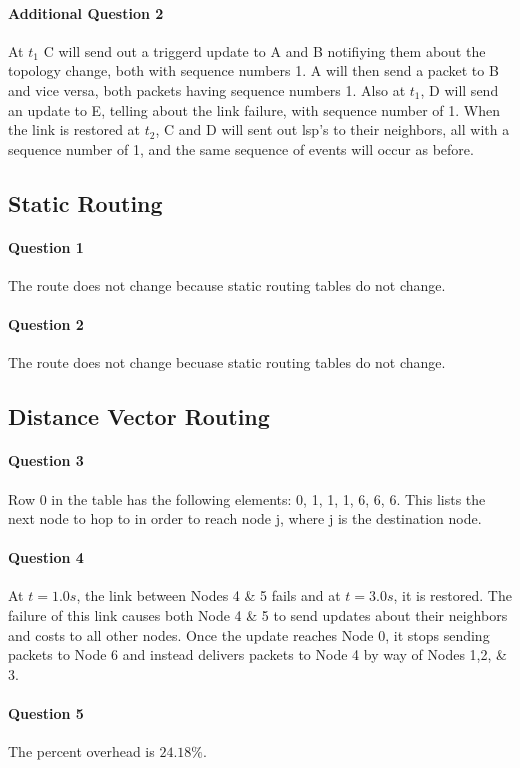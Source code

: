 \documentclass[12pt]{article}
\begin{document}
\paragraph{Additional Question 2}
At $t_1$ C will send out a triggerd update to A and B notifiying them about the topology change, both with sequence numbers 1. A will then send a packet to B and vice versa, both packets having sequence numbers 1. Also at $t_1$, D will send an update to E, telling about the link failure, with sequence number of 1. When the link is restored at $t_2$, C and D will sent out lsp's to their neighbors, all with a sequence number of 1, and the same sequence of events will occur as before.

\subsection{Static Routing}
\paragraph{Question 1}
The route does not change because static routing tables do not change. 
\paragraph{Question 2}
The route does not change becuase static routing tables do not change. 
\subsection{Distance Vector Routing}
\paragraph{Question 3}
Row 0 in the table has the following elements: 0, 1, 1, 1, 6, 6, 6. This lists the next node to hop to in order to reach node j, where j is the destination node.
\paragraph{Question 4}
At $t = 1.0s$, the link between Nodes 4 \& 5 fails and at $t = 3.0s$, it is restored. The failure of this link causes both Node 4 \& 5 to send updates about their neighbors and costs to all other nodes. Once the update reaches Node 0, it stops sending packets to Node 6 and instead delivers packets to Node 4 by way of Nodes 1,2, \& 3. 
\paragraph{Question 5}
The percent overhead is $24.18\%$.
\end{document}
